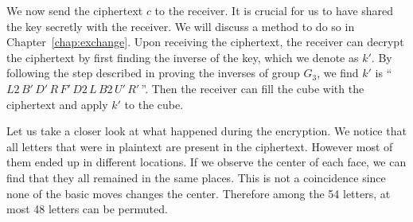 \par We now send the ciphertext $c$ to the receiver. It is crucial for us to have shared the key secretly with the receiver. We will discuss a method to do so in Chapter~\ref{chap:exchange}. Upon receiving the ciphertext, the receiver can decrypt the ciphertext by first finding the inverse of the key, which we denote as $k'$. By following the step described in proving the inverses of group $G_3$, we find $k'$ is ``$L2\,B'\,D'\,R\,F'\,D2\,L\,B2\,U'\,R'\,$''. Then the receiver can fill the cube with the ciphertext and apply $k'$ to the cube.
\par Let us take a closer look at what happened during the encryption. We notice that all letters that were in plaintext are present in the ciphertext. However most of them ended up in different locations. If we observe the center of each face, we can find that they all remained in the same places. This is not a coincidence since none of the basic moves changes the center. Therefore among the 54 letters, at most 48 letters can be permuted.

